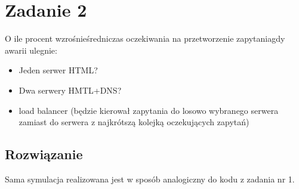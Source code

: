 \documentclass[12pt,oneside,a4paper]{book} %
\theoremstyle{break}
\begin{document}
\chapter*{Zadanie 2}

O ile procent wzrośnieśredniczas oczekiwania na przetworzenie zapytaniagdy awarii ulegnie:
\begin{itemize}
  \item Jeden serwer HTML?
  \item Dwa serwery HMTL+DNS?
  \item load balancer (będzie kierował zapytania do losowo wybranego serwera zamiast do serwera z najkrótszą kolejką oczekujących zapytań)
\end{itemize}

\section*{Rozwiązanie}

Sama symulacja realizowana jest w sposób analogiczny do kodu z zadania nr 1.
\end{document}
